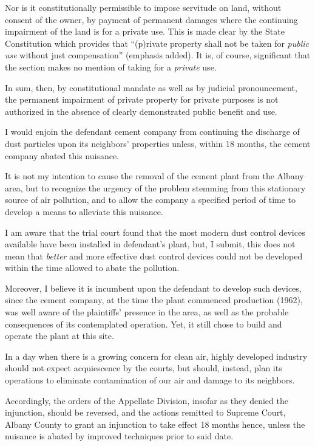 Nor is it constitutionally permissible to impose servitude on land, without
consent of the owner, by payment of permanent damages where the continuing
impairment of the land is for a private use. This is made clear by the State
Constitution which provides that ``(p)rivate property shall not be taken for
\textit{public use} without just compensation'' (emphasis added). It is, of
course, significant that the section makes no mention of taking for a
\textit{private} use.

In sum, then, by constitutional mandate as well as by judicial pronouncement,
the permanent impairment of private property for private purposes is not
authorized in the absence of clearly demonstrated public benefit and use.

I would enjoin the defendant cement company from continuing the discharge of
dust particles upon its neighbors' properties unless, within 18 months, the
cement company abated this nuisance.

It is not my intention to cause the removal of the cement plant from the Albany
area, but to recognize the urgency of the problem stemming from this stationary
source of air pollution, and to allow the company a specified period of time to
develop a means to alleviate this nuisance.

I am aware that the trial court found that the most modern dust control devices
available have been installed in defendant's plant, but, I submit, this does not
mean that \textit{better} and more effective dust control devices could not be
developed within the time allowed to abate the pollution.

Moreover, I believe it is incumbent upon the defendant to develop such devices,
since the cement company, at the time the plant commenced production (1962), was
well aware of the plaintiffs' presence in the area, as well as the probable
consequences of its contemplated operation. Yet, it still chose to build and
operate the plant at this site.

In a day when there is a growing concern for clean air, highly developed
industry should not expect acquiescence by the courts, but should, instead, plan
its operations to eliminate contamination of our air and damage to its
neighbors.

Accordingly, the orders of the Appellate Division, insofar as they denied the
injunction, should be reversed, and the actions remitted to Supreme Court,
Albany County to grant an injunction to take effect 18 months hence, unless the
nuisance is abated by improved techniques prior to said date.

